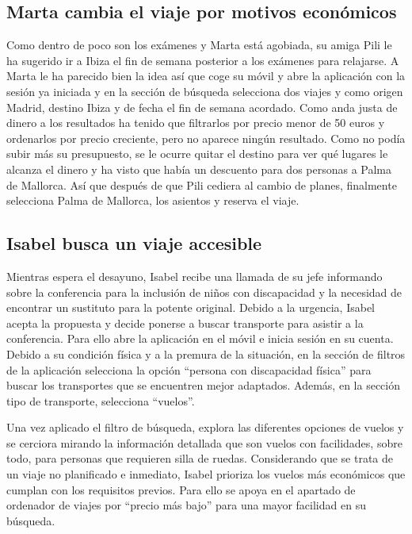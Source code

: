 \subsection{Marta cambia el viaje por motivos económicos}

Como dentro de poco son los exámenes y Marta está agobiada, su amiga Pili le ha
sugerido ir a Ibiza el fin de semana posterior a los exámenes para relajarse. A
Marta le ha parecido bien la idea así que coge su móvil y abre la aplicación
con la sesión ya iniciada y en la sección de búsqueda selecciona dos viajes y
como origen Madrid, destino Ibiza y de fecha el fin de semana acordado. Como
anda justa de dinero a los resultados ha tenido que filtrarlos por precio menor
de 50 euros y ordenarlos por precio creciente, pero no aparece ningún
resultado. Como no podía subir más su presupuesto, se le ocurre quitar el
destino para ver qué lugares le alcanza el dinero y ha visto que había un
descuento para dos personas a Palma de Mallorca. Así que después de que Pili
cediera al cambio de planes, finalmente selecciona Palma de Mallorca, los
asientos y reserva el viaje.

\subsection{Isabel busca un viaje accesible}

Mientras espera el desayuno, Isabel recibe una llamada de su jefe informando
sobre la conferencia para la inclusión de niños con discapacidad y la necesidad
de encontrar un sustituto para la potente original. Debido a la urgencia,
Isabel acepta la propuesta y decide ponerse a buscar transporte para asistir a
la conferencia. Para ello abre la aplicación en el móvil e inicia sesión en su
cuenta. Debido a su condición física y a la premura de la situación, en la
sección de filtros de la aplicación selecciona la opción “persona con
discapacidad física” para buscar los transportes que se encuentren mejor
adaptados. Además, en la sección tipo de transporte, selecciona “vuelos”.

Una vez aplicado el filtro de búsqueda, explora las diferentes opciones de
vuelos y se cerciora mirando la información detallada que son vuelos con
facilidades, sobre todo, para personas que requieren silla de ruedas.
Considerando que se trata de un viaje no planificado e inmediato, Isabel
prioriza los vuelos más económicos que cumplan con los requisitos previos. Para
ello se apoya en el apartado de ordenador de viajes por “precio más bajo” para
una mayor facilidad en su búsqueda.

